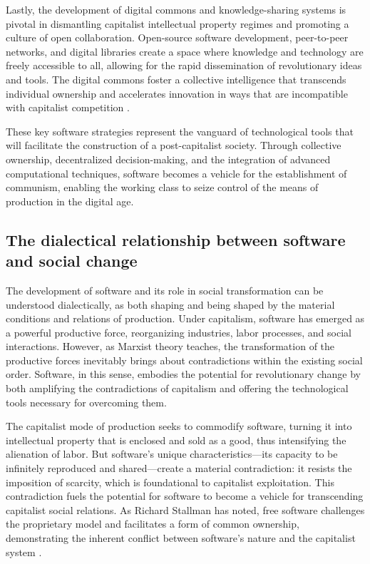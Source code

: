 \begin{refsection}
Lastly, the development of digital commons and knowledge-sharing systems is pivotal in dismantling capitalist intellectual property regimes and promoting a culture of open collaboration. Open-source software development, peer-to-peer networks, and digital libraries create a space where knowledge and technology are freely accessible to all, allowing for the rapid dissemination of revolutionary ideas and tools. The digital commons foster a collective intelligence that transcends individual ownership and accelerates innovation in ways that are incompatible with capitalist competition \cite[pp.~28-30]{stallman2015}.

These key software strategies represent the vanguard of technological tools that will facilitate the construction of a post-capitalist society. Through collective ownership, decentralized decision-making, and the integration of advanced computational techniques, software becomes a vehicle for the establishment of communism, enabling the working class to seize control of the means of production in the digital age.

\subsection{The dialectical relationship between software and social change}

The development of software and its role in social transformation can be understood dialectically, as both shaping and being shaped by the material conditions and relations of production. Under capitalism, software has emerged as a powerful productive force, reorganizing industries, labor processes, and social interactions. However, as Marxist theory teaches, the transformation of the productive forces inevitably brings about contradictions within the existing social order. Software, in this sense, embodies the potential for revolutionary change by both amplifying the contradictions of capitalism and offering the technological tools necessary for overcoming them.

The capitalist mode of production seeks to commodify software, turning it into intellectual property that is enclosed and sold as a good, thus intensifying the alienation of labor. But software’s unique characteristics—its capacity to be infinitely reproduced and shared—create a material contradiction: it resists the imposition of scarcity, which is foundational to capitalist exploitation. This contradiction fuels the potential for software to become a vehicle for transcending capitalist social relations. As Richard Stallman has noted, free software challenges the proprietary model and facilitates a form of common ownership, demonstrating the inherent conflict between software’s nature and the capitalist system \cite[pp.~12-14]{stallman2015}.


\end{refsection}
